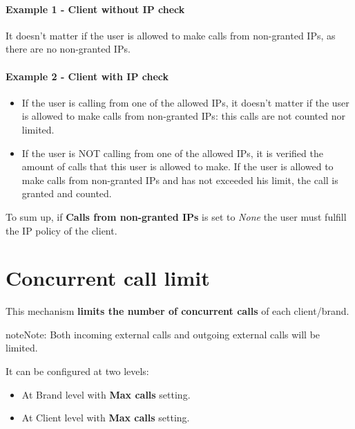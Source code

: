 \documentclass[letterpaper,10pt,english]{sphinxmanual}
\begin{document}
\paragraph{Example 1 - Client without IP check}

It doesn't matter if the user is allowed to make calls from non-granted IPs,
as there are no non-granted IPs.
\paragraph{Example 2 - Client with IP check}
\begin{itemize}
\item {} 
If the user is calling from one of the allowed IPs,
it doesn't matter if the user is allowed to make calls from non-granted IPs:
this calls are not counted nor limited.

\item {} 
If the user is NOT calling from one of the allowed IPs, it is verified the
amount of calls that this user is allowed to make. If the user is allowed to
make calls from non-granted IPs and has not exceeded his limit, the call is
granted and counted.

\end{itemize}

To sum up, if \textbf{Calls from non-granted IPs} is set to \emph{None} the user must fulfill the IP policy of the client.


\section{Concurrent call limit}
\label{security_and_maintenance/security/concurrent_call_limit::doc}\label{security_and_maintenance/security/concurrent_call_limit:concurrent-call-limit}
This mechanism \textbf{limits the number of concurrent calls} of each client/brand.

\begin{notice}{note}{Note:}
Both incoming external calls and outgoing external calls will be limited.
\end{notice}

It can be configured at two levels:
\begin{itemize}
\item {} 
At Brand level with \textbf{Max calls} setting.

\item {} 
At Client level with \textbf{Max calls} setting.

\end{itemize}
\end{document}
